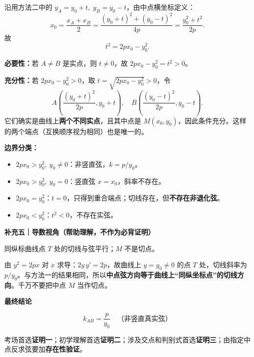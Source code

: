 \begin{proofbox}
沿用方法二中的 $y_A=y_0+t,\;y_B=y_0-t$，由中点横坐标定义：
\[
 x_0=\frac{x_A+x_B}{2}
 =\frac{(y_0+t)^2+(y_0-t)^2}{4p}
 =\frac{y_0^2+t^2}{2p}.
\]
故
\[\boxed{t^2=2px_0-y_0^2}.\]
\par\noindent\textbf{必要性：}若 $A\ne B$ 是实点，则 $t\ne0$，故 $2px_0-y_0^2=t^2>0$。
\par\noindent\textbf{充分性：}若 $2px_0-y_0^2>0$，取 $t=\sqrt{2px_0-y_0^2}>0$，令
\[
 A\left(\frac{(y_0+t)^2}{2p},y_0+t\right),\quad
 B\left(\frac{(y_0-t)^2}{2p},y_0-t\right).
\]
它们确实是曲线上\textbf{两个不同实点}，且其中点是 $M(x_0,y_0)$，因此条件充分。这样的两个端点（互换顺序视为相同）也是唯一的。
\par\smallskip
\par\noindent\textbf{边界分类：}
\begin{itemize}[leftmargin=*,itemsep=0.2em]
 \item $2px_0>y_0^2,\ y_0\ne0$：非竖直弦，$k=p/y_0$。
 \item $2px_0>y_0^2,\ y_0=0$：竖直弦 $x=x_0$，斜率不存在。
 \item $2px_0=y_0^2$：$t=0$，只得到重合端点；切线存在，但\textbf{不存在非退化弦}。
 \item $2px_0<y_0^2$：$t^2<0$，不存在实弦。
\end{itemize}
\par\medskip
\begin{minipage}{\linewidth}
\par\medskip
\begin{minipage}{\linewidth}
\noindent
\textbf{\textcolor{CProof}{补充五｜导数视角（帮助理解，不作为必背证明）}}\par\nobreak\smallskip
\par
\begin{minipage}{\linewidth}
\begin{center}

\par\small 同纵标曲线点 $T$ 处的切线与弦平行；$M$ 不是切点。
\end{center}
\end{minipage}\par
\end{minipage}
\par

\par

\end{minipage}


由 $y^2=2px$ 对 $x$ 求导：$2y\,y'=2p$，故曲线上 $y=y_0\ne0$ 的点 $T$ 处，切线斜率为 $p/y_0$。与方法一的结果相同，所以\textbf{中点弦方向等于曲线上“同纵坐标点”的切线方向}。千万不要把中点 $M$ 当作切点。
\par\medskip
\begin{minipage}{\linewidth}
\noindent
\textbf{\textcolor{CProof}{最终结论}}\par\nobreak\smallskip
\[\boxed{\displaystyle k_{AB}=\frac{p}{y_0}\quad\text{（非竖直真实弦）}}\]\par
\end{minipage}
\par

考场首选\textbf{证明一}；初学理解首选\textbf{证明二}；涉及交点和判别式首选\textbf{证明三}；由指定中点反求弦要加\textbf{存在性验证}。
\end{proofbox}
